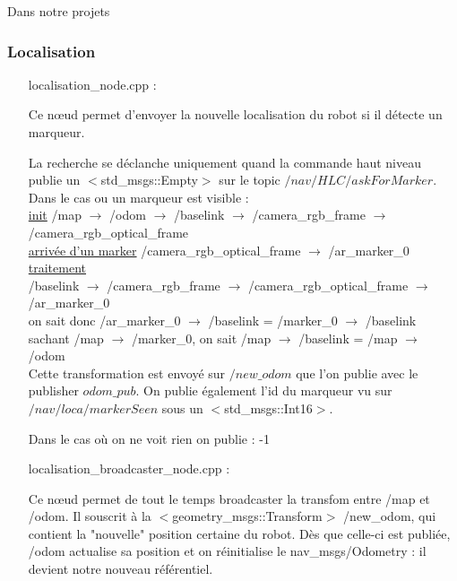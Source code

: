 \documentclass[10pt,a4paper]{article}
\begin{document}
Dans notre projets

\subsubsection{Localisation}
\label{sec:localision}

\begin{itemize}

\item [localisation\_node.cpp] :

Ce nœud permet d'envoyer la nouvelle localisation du robot si il détecte un marqueur. 

\noindent La recherche se déclanche uniquement quand la commande haut niveau publie un $<$std\_msgs::Empty$>$ sur le topic $/nav/HLC/askForMarker$. \\

Dans le cas ou un marqueur est visible : \\
\noindent \underline{init} 
/map $\rightarrow$ /odom $\rightarrow$ /baselink $\rightarrow$ /camera\_rgb\_frame $\rightarrow$ /camera\_rgb\_optical\_frame \\
\noindent \underline{arrivée d'un marker} 
/camera\_rgb\_optical\_frame $\rightarrow$ /ar\_marker\_0 \\
\noindent \underline{traitement} \\
\indent /baselink $\rightarrow$ /camera\_rgb\_frame $\rightarrow$ /camera\_rgb\_optical\_frame $\rightarrow$ /ar\_marker\_0 \\
\indent on sait donc /ar\_marker\_0 $\rightarrow$ /baselink 
= /marker\_0 $\rightarrow$ /baselink \\
\indent sachant /map $\rightarrow$ /marker\_0, on sait /map $\rightarrow$ /baselink = /map  $\rightarrow$ /odom \\

\noindent Cette transformation est envoyé sur $/new\_odom$ que l'on publie avec le publisher $odom\_pub$. On publie également l'id du marqueur vu sur $/nav/loca/markerSeen$ sous un $<$std\_msgs::Int16$>$. 

Dans le cas où on ne voit rien on publie : -1 \\

\item [localisation\_broadcaster\_node.cpp] :

Ce nœud permet de tout le temps broadcaster la transfom entre /map et /odom. Il souscrit à la $<$geometry\_msgs::Transform$>$ /new\_odom, qui contient la "nouvelle" position certaine du robot. Dès que celle-ci est publiée, /odom actualise sa position et on réinitialise le nav\_msgs/Odometry : il devient notre nouveau référentiel.
\end{itemize}
\end{document}
